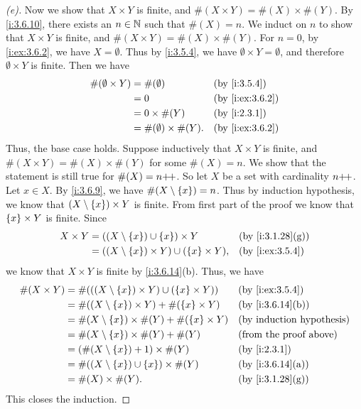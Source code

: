\begin{proof}[(e)]
  Now we show that \(X \times Y\) is finite, and \(\#(X \times Y) = \#(X) \times \#(Y)\).
  By \cref{i:3.6.10}, there exists an \(n \in \mathbb{N}\) such that \(\#(X) = n\).
  We induct on \(n\) to show that \(X \times Y\) is finite, and \(\#(X \times Y) = \#(X) \times \#(Y)\).
  For \(n = 0\), by \cref{i:ex:3.6.2}, we have \(X = \emptyset\).
  Thus by \cref{i:3.5.4}, we have \(\emptyset \times Y = \emptyset\), and therefore \(\emptyset \times Y\) is finite.
  Then we have
  \begin{align*}
    \#(\emptyset \times Y) & = \#(\emptyset)               &  & \by{i:3.5.4}    \\
                           & = 0                           &  & \by{i:ex:3.6.2} \\
                           & = 0 \times \#(Y)              &  & \by{i:2.3.1}    \\
                           & = \#(\emptyset) \times \#(Y). &  & \by{i:ex:3.6.2}
  \end{align*}
  Thus, the base case holds.
  Suppose inductively that \(X \times Y\) is finite, and \(\#(X \times Y) = \#(X) \times \#(Y)\) for some \(\#(X) = n\).
  We show that the statement is still true for \(\#(X) = n{+}\!{+}\).
  So let \(X\) be a set with cardinality \(n{+}\!{+}\).
  Let \(x \in X\).
  By \cref{i:3.6.9}, we have \(\#(X \setminus \left\lbrace x\right\rbrace) = n\).
  Thus by induction hypothesis, we know that \((X \setminus \left\lbrace x\right\rbrace) \times Y\) is finite.
  From first part of the proof we know that \(\left\lbrace x\right\rbrace \times Y\) is finite.
  Since
  \begin{align*}
    X \times Y & = ((X \setminus \set{x}) \cup \set{x}) \times Y             &  & \by{i:3.1.28}[g] \\
               & = ((X \setminus \set{x}) \times Y) \cup (\set{x} \times Y), &  & \by{i:ex:3.5.4}
  \end{align*}
  we know that \(X \times Y\) is finite by \cref{i:3.6.14}(b).
  Thus, we have
  \begin{align*}
    \#(X \times Y) & = \#(((X \setminus \set{x}) \times Y) \cup (\set{x} \times Y)) &  & \by{i:ex:3.5.4}               \\
                   & = \#((X \setminus \set{x}) \times Y) + \#(\set{x} \times Y)    &  & \by{i:3.6.14}[b]              \\
                   & = \#(X \setminus \set{x}) \times \#(Y) + \#(\set{x} \times Y)  &  & \byIH                         \\
                   & = \#(X \setminus \set{x}) \times \#(Y) + \#(Y)                 &  & \text{(from the proof above)} \\
                   & = (\#(X \setminus \set{x}) + 1) \times \#(Y)                   &  & \by{i:2.3.1}                  \\
                   & = \#((X \setminus \set{x}) \cup \set{x}) \times \#(Y)          &  & \by{i:3.6.14}[a]              \\
                   & = \#(X) \times \#(Y).                                          &  & \by{i:3.1.28}[g]
  \end{align*}
  This closes the induction.
\end{proof}

